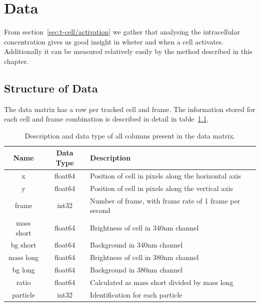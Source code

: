 \chapter{Data}
\label{chapter:data}

From section~\ref{sec:t-cell/activation} we gather that analysing the intracellular \Calcium concentration gives us good insight in wheter and when a cell activates. Additionally it can be measured relatively easily by the method described in this chapter.

\section{Structure of Data}

The data matrix has a row per tracked cell and frame. The information stored for each cell and frame combination is described in detail in table~\ref{tab:information_data_matrix}.

\begin{table}[h!]
	\centering
	\begin{tabular}{|c|c|l|}
		\hline
		\textbf{Name} & \textbf{Data Type} & \textbf{Description} \\
		\hline
		x & float64 & Position of cell in pixels along the horizontal axis \\
		\hline
		y & float64 & Position of cell in pixels along the vertical axis \\
		\hline
		frame & int32 & Number of frame, with frame rate of 1 frame per second \\
		\hline
		mass short & float64 & Brightness of cell in 340nm channel \\
		\hline
		bg short & float64 & Background in 340nm channel \\
		\hline
		mass long & float64 & Brightness of cell in 380nm channel \\
		\hline
		bg long & float64 & Background in 380nm channel \\
		\hline
		ratio & float64 & Calculated as mass short divided by mass long \\
		\hline
		particle & int32 & Identification for each particle \\
		\hline
	\end{tabular}
	\caption{Description and data type of all columns present in the data matrix.}
	\label{tab:information_data_matrix}
\end{table}


